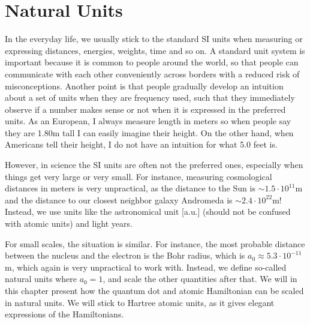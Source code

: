 \chapter{Natural Units} \label{app:units}
In the everyday life, we usually stick to the standard SI units when measuring or expressing distances, energies, weights, time and so on. A standard unit system is important because it is common to people around the world, so that people can communicate with each other conveniently across borders with a reduced risk of misconceptions. Another point is that people gradually develop an intuition about a set of units when they are frequency used, such that they immediately observe if a number makes sense or not when it is expressed in the preferred units. As an European, I always measure length in meters so when people say they are 1.80m tall I can easily imagine their height. On the other hand, when Americans tell their height, I do not have an intuition for what 5.0 feet is. 

However, in science the SI units are often not the preferred ones, especially when things get very large or very small. For instance, measuring cosmological distances in meters is very unpractical, as the distance to the Sun is $\sim1.5\cdot10^{11}$m and the distance to our closest neighbor galaxy Andromeda is $\sim 2.4\cdot10^{22}$m! Instead, we use units like the astronomical unit [a.u.] (should not be confused with atomic units) and light years. 

For small scales, the situation is similar. For instance, the most probable distance between the nucleus and the electron is the Bohr radius, which is $a_0\approx5.3\cdot10^{-11}$m, which again is very unpractical to work with. Instead, we define so-called natural units where $a_0=1$, and scale the other quantities after that. We will in this chapter present how the quantum dot and atomic Hamiltonian can be scaled in natural units. We will stick to Hartree atomic units, as it gives elegant expressions of the Hamiltonians.  

